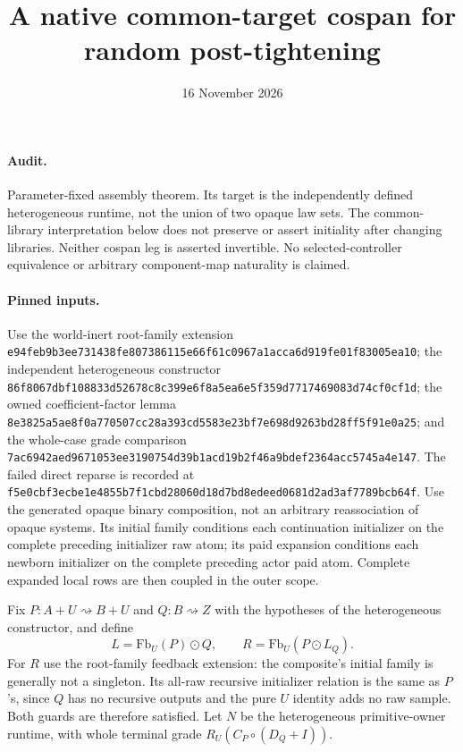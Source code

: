 \documentclass[11pt]{article}\usepackage{amsmath,amssymb,amsthm,geometry}\geometry{margin=1in}
\title{A native common-target cospan for random post-tightening}\date{16 November 2026}
\begin{document}
\maketitle
\paragraph{Audit.} Parameter-fixed assembly theorem. Its target is the independently defined heterogeneous runtime, not the union of two opaque law sets. The common-library interpretation below does not preserve or assert initiality after changing libraries. Neither cospan leg is asserted invertible. No selected-controller equivalence or arbitrary component-map naturality is claimed.

\paragraph{Pinned inputs.} Use the world-inert root-family extension
\texttt{e94feb9b3ee731438fe807386115e66f61c0967a1acca6d919fe01f83005ea10};
the independent heterogeneous constructor
\texttt{86f8067dbf108833d52678c8c399e6f8a5ea6e5f359d7717469083d74cf0cf1d};
the owned coefficient-factor lemma
\texttt{8e3825a5ae8f0a770507cc28a393cd5583e23bf7e698d9263bd28ff5f91e0a25};
and the whole-case grade comparison
\texttt{7ac6942aed9671053ee3190754d39b1acd19b2f46a9bdef2364acc5745a4e147}.
The failed direct reparse is recorded at
\texttt{f5e0cbf3ecbe1e4855b7f1cbd28060d18d7bd8edeed0681d2ad3af7789bcb64f}.
Use the generated opaque binary composition, not an arbitrary reassociation of opaque systems. Its initial family conditions each continuation initializer on the complete preceding initializer raw atom; its paid expansion conditions each newborn initializer on the complete preceding actor paid atom. Complete expanded local rows are then coupled in the outer scope.

Fix $P:A+U\rightsquigarrow B+U$ and $Q:B\rightsquigarrow Z$ with the hypotheses of the heterogeneous constructor, and define
\[
 L=\mathrm{Fb}_U(P)\odot Q,\qquad
 R=\mathrm{Fb}_U(P\odot L_Q).
\]
For $R$ use the root-family feedback extension: the composite's initial family is generally not a singleton. Its all-raw recursive initializer relation is the same as $P$'s, since $Q$ has no recursive outputs and the pure $U$ identity adds no raw sample. Both guards are therefore satisfied. Let $N$ be the heterogeneous primitive-owner runtime, with whole terminal grade $R_U(C_P\circ(D_Q+I))$.
\end{document}
